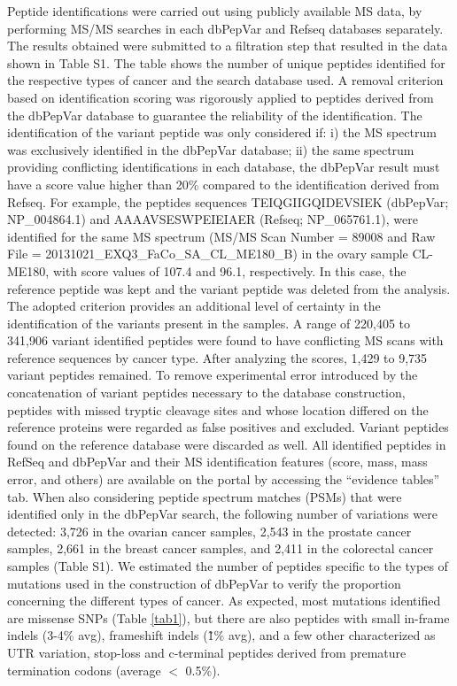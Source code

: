 \documentclass{ieeeaccess}
\begin{document}
Peptide identifications were carried out using publicly available MS data, by performing MS/MS searches in each dbPepVar and Refseq databases separately. The results obtained were submitted to a filtration step that resulted in the data shown in Table S1. The table shows the number of unique peptides identified for the respective types of cancer and the search database used. A removal criterion based on identification scoring was rigorously applied to peptides derived from the dbPepVar database to guarantee the reliability of the identification. The identification of the variant peptide was only considered if: i) the MS spectrum was exclusively identified in the dbPepVar database; ii) the same spectrum providing conflicting identifications in each database, the dbPepVar result must have a score value higher than 20\% compared to the identification derived from Refseq. For example, the peptides sequences TEIQGIIGQIDEVSIEK (dbPepVar; NP\_004864.1) and AAAAVSESWPEIEIAER (Refseq; NP\_065761.1), were identified for the same MS spectrum (MS/MS Scan Number = 89008 and Raw File = 20131021\_EXQ3\_FaCo\_SA\_CL\_ME180\_B) in the ovary sample CL-ME180, with score values of 107.4 and 96.1, respectively. In this case, the reference peptide was kept and the variant peptide was deleted from the analysis. The adopted criterion provides an additional level of certainty in the identification of the variants present in the samples. A range of 220,405 to 341,906 variant identified peptides were found to have conflicting MS scans with reference sequences by cancer type. After analyzing the scores, 1,429 to 9,735 variant peptides remained. To remove experimental error introduced by the concatenation of variant peptides necessary to the database construction, peptides with missed tryptic cleavage sites and whose location differed on the reference proteins were regarded as false positives and excluded. Variant peptides found on the reference database were discarded as well. All identified peptides in RefSeq and dbPepVar and their MS identification features (score, mass, mass error, and others) are available on the portal by accessing the ``evidence tables'' tab.
When also considering peptide spectrum matches (PSMs) that were identified only in the dbPepVar search, the following number of variations were detected: 3,726 in the ovarian cancer samples, 2,543 in the prostate cancer samples, 2,661 in the breast cancer samples, and 2,411 in the colorectal cancer samples (Table S1). We estimated the number of peptides specific to the types of mutations used in the construction of dbPepVar to verify the proportion concerning the different types of cancer. As expected, most mutations identified are missense SNPs (Table \ref{tab1}), but there are also peptides with small in-frame indels (3-4\% avg), frameshift indels (\~1\% avg), and a few other characterized as UTR variation, stop-loss and c-terminal peptides derived from premature termination codons (average $<$ 0.5\%). 
\end{document}
